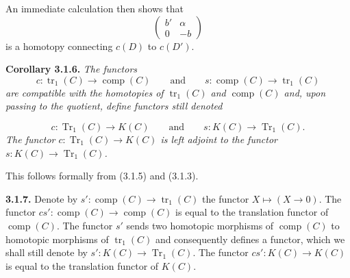 An immediate calculation then shows that
\begin{equation*}
  \begin{pmatrix}
    b' & \alpha\\
    0  & -b
  \end{pmatrix}
\end{equation*}
is a homotopy connecting $c(D)$ to $c(D')$.

\noindent\textbf{Corollary 3.1.6.}\quad
\emph{The functors}
\begin{equation*}
  c\colon\operatorname{tr}_1(C)\longrightarrow\operatorname{comp}(C)
  \qquad\text{and}\qquad
  s\colon\operatorname{comp}(C)\longrightarrow\operatorname{tr}_1(C)
\end{equation*}
\emph{are compatible with the homotopies of $\operatorname{tr}_1(C)$ and
$\operatorname{comp}(C)$ and, upon passing to the quotient, define functors
still denoted}

\begin{equation*}
  c\colon\operatorname{Tr}_1(C)\longrightarrow K(C)
  \qquad\text{and}\qquad
  s\colon K(C)\longrightarrow\operatorname{Tr}_1(C).
\end{equation*}
\emph{The functor $c\colon\operatorname{Tr}_1(C)\longrightarrow K(C)$ is left
adjoint to the functor
$s\colon K(C)\longrightarrow\operatorname{Tr}_1(C)$.}

This follows formally from (3.1.5) and (3.1.3).

\noindent\textbf{3.1.7.}\quad
{}
Denote by
$s'\colon\operatorname{comp}(C)\longrightarrow\operatorname{tr}_1(C)$ the
functor $X\longmapsto(X\longrightarrow 0)$.
The functor
$cs'\colon\operatorname{comp}(C)\longrightarrow\operatorname{comp}(C)$ is
equal to the translation functor of $\operatorname{comp}(C)$.
The functor $s'$ sends two homotopic morphisms of $\operatorname{comp}(C)$ to
homotopic morphisms of $\operatorname{tr}_1(C)$ and consequently defines a
functor, which we shall still denote by
$s'\colon K(C)\longrightarrow\operatorname{Tr}_1(C)$.
The functor $cs'\colon K(C)\longrightarrow K(C)$ is equal to the translation
functor of $K(C)$.
